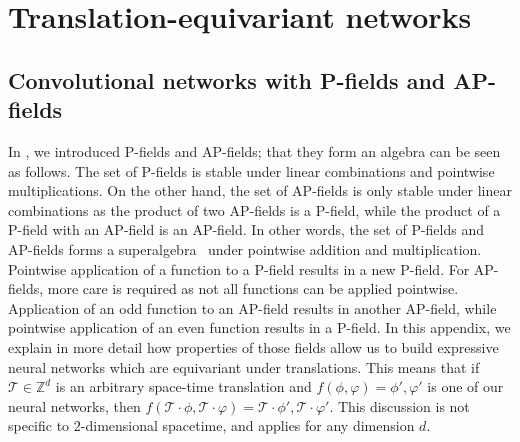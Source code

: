 \documentclass[aps,prd,twocolumn,nofootinbib,superscriptaddress,preprintnumbers]{revtex4-1}
\begin{document}
\section{Translation-equivariant networks}

\subsection{Convolutional networks with P-fields and AP-fields}
\label{app:convnet-fields}

In , we introduced P-fields and AP-fields; that they form an algebra can be seen as follows. The set of P-fields is stable under linear combinations and pointwise multiplications. On the other hand, the set of AP-fields is only stable under linear combinations as the product of two AP-fields is a P-field, while the product of a P-field with an AP-field is an AP-field. In other words, the set of P-fields and AP-fields forms a superalgebra~\cite{Deligne:1999qp} under pointwise addition and multiplication. Pointwise application of a function to a P-field results in a new P-field. For AP-fields, more care is required as not all functions can be applied pointwise. Application of an odd function to an AP-field results in another AP-field, while pointwise application of an even function results in a P-field. In this appendix, we explain in more detail how properties of those fields allow us to build expressive neural networks which are equivariant under translations. This means that if $\mathcal{T} \in \mathbb{Z}^d$ is an arbitrary space-time translation and $f(\phi, \varphi) = \phi', \varphi'$ is one of our neural networks, then $f(\mathcal{T}\cdot\phi, \mathcal{T}\cdot\varphi) = \mathcal{T}\cdot\phi', \mathcal{T}\cdot\varphi'$. This discussion is not specific to $2$-dimensional spacetime, and applies for any dimension $d$.
\end{document}
